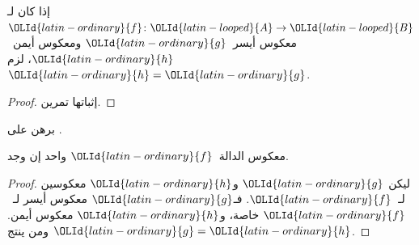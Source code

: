 \documentclass[../../../include/open-logic-section]{subfiles}
\begin{document}
\begin{prop}%
إذا كان لـ$\OLId{latin-ordinary}{f}\colon \OLId{latin-looped}{A} \to \OLId{latin-looped}{B}$ معكوس أيسر~$\OLId{latin-ordinary}{g}$ ومعكوس أيمن~$\OLId{latin-ordinary}{h}$، لزم $\OLId{latin-ordinary}{h} = \OLId{latin-ordinary}{g}$.
\end{prop}

\begin{proof}
إثباتها تمرين.
\end{proof}

\begin{prob}
برهن على .
\end{prob}

\begin{prop}
معكوس الدالة~$\OLId{latin-ordinary}{f}$ واحد إن وجد.
\end{prop}

\begin{proof}
ليكن $\OLId{latin-ordinary}{g}$ و$\OLId{latin-ordinary}{h}$ معكوسين لـ~$\OLId{latin-ordinary}{f}$. فـ$\OLId{latin-ordinary}{g}$ معكوس أيسر لـ~$\OLId{latin-ordinary}{f}$ خاصة،
و$\OLId{latin-ordinary}{h}$ معكوس أيمن. ومن  ينتج $\OLId{latin-ordinary}{g} = \OLId{latin-ordinary}{h}$.
\end{proof}
\end{document}
